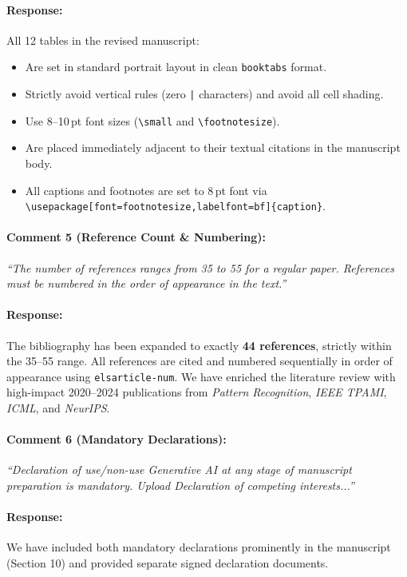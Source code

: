 \documentclass[10pt]{article}
\begin{document}
\paragraph{Response:}
All 12 tables in the revised manuscript:
\begin{itemize}
    \item Are set in standard portrait layout in clean \texttt{booktabs} format.
    \item Strictly avoid vertical rules (zero \texttt{|} characters) and avoid all cell shading.
    \item Use 8--10\,pt font sizes (\texttt{\textbackslash small} and \texttt{\textbackslash footnotesize}).
    \item Are placed immediately adjacent to their textual citations in the manuscript body.
    \item All captions and footnotes are set to 8\,pt font via \texttt{\textbackslash usepackage[font=footnotesize,labelfont=bf]\{caption\}}.
\end{itemize}

\paragraph{Comment 5 (Reference Count \& Numbering):}
\textit{``The number of references ranges from 35 to 55 for a regular paper. References must be numbered in the order of appearance in the text.''}

\paragraph{Response:}
The bibliography has been expanded to exactly \textbf{44 references}, strictly within the 35--55 range. All references are cited and numbered sequentially in order of appearance using \texttt{elsarticle-num}. We have enriched the literature review with high-impact 2020--2024 publications from \textit{Pattern Recognition}, \textit{IEEE TPAMI}, \textit{ICML}, and \textit{NeurIPS}.

\paragraph{Comment 6 (Mandatory Declarations):}
\textit{``Declaration of use/non-use Generative AI at any stage of manuscript preparation is mandatory. Upload Declaration of competing interests...''}

\paragraph{Response:}
We have included both mandatory declarations prominently in the manuscript (Section 10) and provided separate signed declaration documents.
\end{document}

